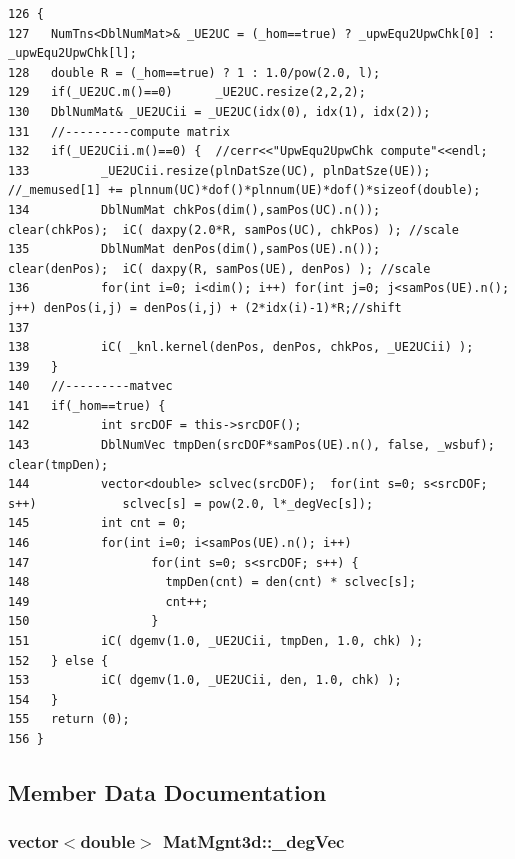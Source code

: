\footnotesize\begin{verbatim}126 {
127   NumTns<DblNumMat>& _UE2UC = (_hom==true) ? _upwEqu2UpwChk[0] : _upwEqu2UpwChk[l];
128   double R = (_hom==true) ? 1 : 1.0/pow(2.0, l);  
129   if(_UE2UC.m()==0)      _UE2UC.resize(2,2,2);
130   DblNumMat& _UE2UCii = _UE2UC(idx(0), idx(1), idx(2));
131   //---------compute matrix
132   if(_UE2UCii.m()==0) {  //cerr<<"UpwEqu2UpwChk compute"<<endl;
133          _UE2UCii.resize(plnDatSze(UC), plnDatSze(UE)); //_memused[1] += plnnum(UC)*dof()*plnnum(UE)*dof()*sizeof(double);
134          DblNumMat chkPos(dim(),samPos(UC).n());         clear(chkPos);  iC( daxpy(2.0*R, samPos(UC), chkPos) ); //scale
135          DblNumMat denPos(dim(),samPos(UE).n());         clear(denPos);  iC( daxpy(R, samPos(UE), denPos) ); //scale
136          for(int i=0; i<dim(); i++) for(int j=0; j<samPos(UE).n(); j++) denPos(i,j) = denPos(i,j) + (2*idx(i)-1)*R;//shift
137          
138          iC( _knl.kernel(denPos, denPos, chkPos, _UE2UCii) );
139   }
140   //---------matvec
141   if(_hom==true) {
142          int srcDOF = this->srcDOF();
143          DblNumVec tmpDen(srcDOF*samPos(UE).n(), false, _wsbuf);         clear(tmpDen);
144          vector<double> sclvec(srcDOF);  for(int s=0; s<srcDOF; s++)            sclvec[s] = pow(2.0, l*_degVec[s]);
145          int cnt = 0;
146          for(int i=0; i<samPos(UE).n(); i++)
147                 for(int s=0; s<srcDOF; s++) {
148                   tmpDen(cnt) = den(cnt) * sclvec[s];
149                   cnt++;
150                 }
151          iC( dgemv(1.0, _UE2UCii, tmpDen, 1.0, chk) );
152   } else {
153          iC( dgemv(1.0, _UE2UCii, den, 1.0, chk) );
154   }
155   return (0);
156 }
\end{verbatim}\normalsize 




\subsection{Member Data Documentation}
\subsubsection{\setlength{\rightskip}{0pt plus 5cm}vector$<$double$>$ {\bf Mat\-Mgnt3d::\_\-deg\-Vec}}\label{classMatMgnt3d_7a8804dd4c063a2060da6494c8815b6b_7a8804dd4c063a2060da6494c8815b6b}




